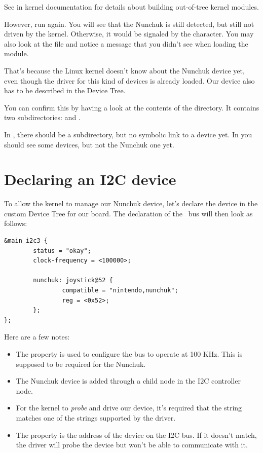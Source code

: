 See  in kernel documentation
for details about building out-of-tree kernel modules.

However, run  again. You will see that the
Nunchuk is still detected, but still not driven by the kernel.
Otherwise, it would be signaled by the  character. You
may also look at the  file and notice a
 message that you didn't
see when loading the module.

That's because the Linux kernel doesn't know about the Nunchuk
device yet, even though the driver for this kind of devices is
already loaded. Our device also has to be described in the Device Tree.

You can confirm this by having a look at the contents of the
 directory.  It contains two subdirectories:
 and .

In , there should be a  subdirectory,
but no symbolic link to a device yet. In  you should
see some devices, but not the Nunchuk one yet.

\section{Declaring an I2C device}

To allow the kernel to manage our Nunchuk device, let's declare the
device in the custom Device Tree for our board. The declaration of the \busname\ 
bus will then look as follows:

\begin{verbatim}
&main_i2c3 {
        status = "okay";
        clock-frequency = <100000>;

        nunchuk: joystick@52 {
                compatible = "nintendo,nunchuk";
                reg = <0x52>;
        };
};
\end{verbatim}

Here are a few notes:
\begin{itemize}
\item The  property is used to configure the bus
      to operate at 100 KHz. This is supposed to be required for the
      Nunchuk.
\item The Nunchuk device is added through a child node in the I2C
      controller node.
\item For the kernel to {\em probe} and drive our device, it's required
      that the  string matches one of the
      \code{compatible} strings supported by the driver.
\item The  property is the address of the device on the
      I2C bus. If it doesn't match, the driver will probe the device
      but won't be able to communicate with it.
\end{itemize}

